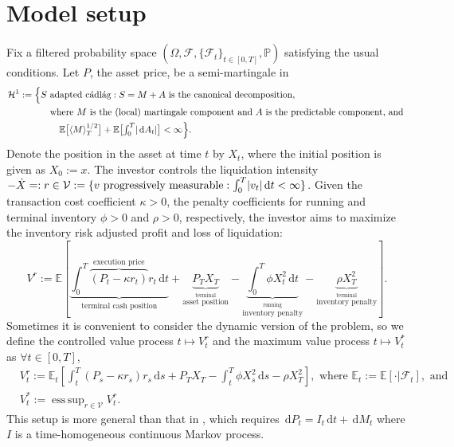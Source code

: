\documentclass[openany,oneside]{article}
\theoremstyle{definition}
\theoremstyle{remark}
\newcommand{\E}{\mathbb{E}} %
\renewcommand{\P}{\mathbb{P}} %
\newcommand{\F}{\mathcal{F}} %
\DeclarePairedDelimiter{\abs}{\lvert}{\rvert} %
\newcommand{\ts}{\textstyle}
\DeclareMathOperator{\esssup}{ess\, sup}
\newcommand{\de}{\,\mathrm{d}}
\begin{document}
\section{Model setup}
Fix a filtered probability space $(\Omega, \F, \{\F_t\}_{t\in[0,T]}, \P)$ satisfying the usual conditions. Let $P$, the asset price, be a semi-martingale in
\begin{align*}
\mathcal{H}^1:=\Bigl\{ & S \textrm{ adapted c\'adl\'ag} : S=M+A \textrm{ is the canonical decomposition, } \\
& \hspace{1em}\textrm{where $M$ is the (local) martingale component and $A$ is the predictable component, and } \\
& \ts\hspace{2em}\E\bigl[\langle M\rangle^{1/2}_T\bigr] + \E\bigl[\int_0^T \abs{\de A_t}\bigr] < \infty\Bigr\}.
\end{align*}
Denote the position in the asset at time $t$ by $X_t$, where the initial position is given as $X_0:=x$. The investor controls the liquidation intensity $-\dot{X} =: r \in \mathcal{V} := \{v \textrm{ progressively measurable} : \int_0^T \abs{v_t} \de t < \infty \}$. Given the transaction cost coefficient $\kappa>0$, the penalty coefficients for running and terminal inventory $\phi>0$ and $\rho>0$, respectively, the investor aims to maximize the inventory risk adjusted profit and loss of liquidation:
\[
\ts V^r:= \E\left[\underbrace{\int_0^T \overbrace{(P_t - \kappa r_t)}^{\textrm{execution price}} r_t \de t}_{\textrm{terminal cash position}} + \underbrace{P_T X_T}_{\stackrel{\textrm{terminal}}{\textrm{asset position}}} - \underbrace{\int_0^T \phi X_t^2 \de t}_{\stackrel{\textrm{running}}{\textrm{inventory penalty}}} - \underbrace{\rho X_T^2}_{\stackrel{\textrm{terminal}}{\textrm{inventory penalty}}} \right].
\]
Sometimes it is convenient to consider the dynamic version of the problem, so we define the controlled value process $t\mapsto V^r_t$ and the maximum value process $t\mapsto V^\ast_t$ as $\forall t\in[0,T]$,
\begin{align*}
&\ts V^r_t := \E_t \left[\int_t^T (P_s-\kappa r_s)r_s \de s + P_T X_T -\int_t^T \phi X_s^2 \de s - \rho X_T^2 \right], \textrm{ where } \E_t:=\E[\cdot \vert \F_t], \textrm{ and} \\
&\ts V^\ast_t := \esssup_{r\in\mathcal{V}} V^r_t.
\end{align*}
This setup is more general than that in \cite{lehalle2017incorporating}, which requires $\de P_t = I_t \de t + \de M_t$ where $I$ is a time-homogeneous continuous Markov process.
\end{document}
